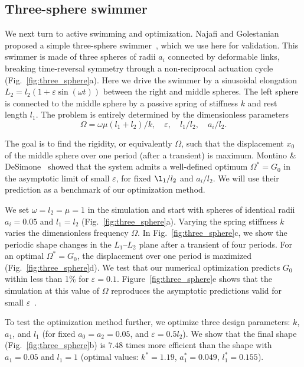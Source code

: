 \documentclass[aps,prfluids,groupedaddress]{revtex4-2}
\begin{document}
\subsection{Three-sphere swimmer}


We next turn to active swimming and optimization. 
Najafi and Golestanian proposed a simple three-sphere swimmer~\cite{Najafi2004}, which we use here for validation. 
This swimmer is made of three spheres of radii $a_i$ connected by deformable links, breaking time-reversal symmetry through a non-reciprocal actuation cycle (Fig.~\ref{fig:three_sphere}a). 
Here we drive the swimmer by a sinusoidal elongation $L_2 = l_2(1+\varepsilon\sin(\omega t))$ between the right and middle spheres. The left sphere is connected to the middle sphere by a passive spring of stiffness $k$ and rest length $l_1$. 
The problem is entirely determined by the dimensionless parameters
\begin{equation}
\Omega = \omega \mu (l_1 + l_2) / k, \quad
\varepsilon, \quad
l_1/l_2, \quad
a_i/l_2. 
\end{equation}

The goal is to find the rigidity, or equivalently $\Omega$, such that the displacement $x_0$ of the middle sphere over one period (after a transient) is maximum. Montino \& DeSimone~\cite{Montino2015} showed that the system admits a well-defined optimum $\Omega^* = G_0$ in the asymptotic limit of small $\varepsilon$, for fixed $\l_1/l_2$ and $a_i / l_2$. 
We will use their prediction as a benchmark of our optimization method. 

We set $\omega=l_2=\mu=1$ in the simulation and start with spheres of identical radii $a_i=0.05$ and $l_1=l_2$ (Fig.~\ref{fig:three_sphere}a). Varying the spring stiffness $k$ varies the dimensionless frequency $\Omega$. In  Fig.~\ref{fig:three_sphere}c, we show the periodic shape changes in the $L_1$--$L_2$ plane after a transient of four periods. For an optimal $\Omega^* = G_0$, the displacement over one period is maximized (Fig.~\ref{fig:three_sphere}d). We test that our numerical optimization predicts $G_0$ within less than 1\% for $\varepsilon=0.1$. Figure~\ref{fig:three_sphere}e shows that the simulation at this value of $\Omega$ reproduces the asymptotic predictions valid for small $\varepsilon$~\cite{Montino2015}.

To test the optimization method further, we optimize three design parameters: $k$, $a_1$, and $l_1$ (for fixed $a_0=a_2=0.05$, and $\varepsilon=0.5 l_2$). We show that the final shape (Fig.~\ref{fig:three_sphere}b) is $7.48$ times more efficient than the shape with $a_1=0.05$ and $l_1=1$ (optimal values: $k^*=1.19$, $a_1^*=0.049$, $l_1^*=0.155$). 
\end{document}
